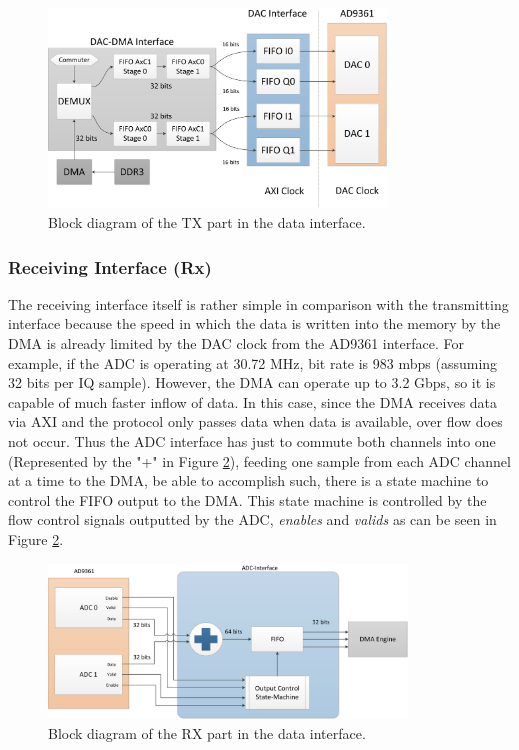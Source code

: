 \begin{figure}[htbp]
    \centering
    \includegraphics[width=0.80\textwidth]{./figures/txdata_if}
    \caption{ Block diagram of the TX part in the data interface.
    \label{fig:dataiftx}}
\end{figure}

\subsubsection{Receiving Interface (Rx)} %

The receiving interface itself is rather simple in comparison with the
transmitting interface because the speed in which the data is written into the
memory by the DMA is already limited by the DAC clock from the AD9361 interface.
For example, if the ADC is operating at 30.72 MHz, bit rate is 983 mbps
(assuming 32 bits per IQ sample). However, the DMA can operate up to 3.2 Gbps,
so it is capable of much faster inflow of data. In this case, since the DMA
receives data via AXI and the protocol only passes data when data is available,
over flow does not occur. Thus the ADC interface has just to commute both
channels into one (Represented by the "+" in Figure \ref{fig:dataifrx}), feeding
one sample from each ADC channel at a time to the DMA, be able to accomplish
such, there is a state machine to control the FIFO output to the DMA. This state
machine is controlled by the flow control signals outputted by the ADC,
\emph{enables} and \emph{valids} as can be seen in Figure \ref{fig:dataifrx}.
\begin{figure}[htbp]
    \centering
    \includegraphics[width=0.85\textwidth]{./figures/rxdata_if}
    \caption{ Block diagram of the RX part in the data interface.
    \label{fig:dataifrx}}
\end{figure}

